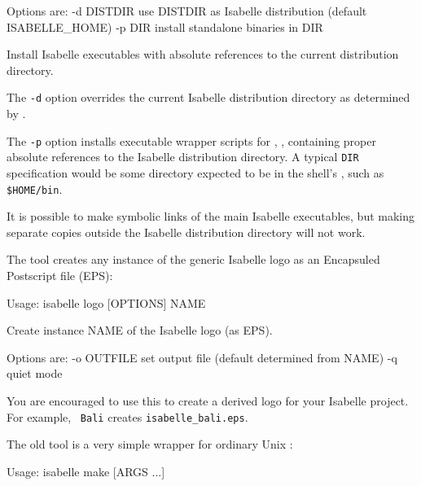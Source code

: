 \begin{isabellebody}
\begin{isamarkuptext}
\begin{ttbox}
  Options are:
    -d DISTDIR   use DISTDIR as Isabelle distribution
                 (default ISABELLE_HOME)
    -p DIR       install standalone binaries in DIR

  Install Isabelle executables with absolute references to the current
  distribution directory.
\end{ttbox}

  The \verb|-d| option overrides the current Isabelle
  distribution directory as determined by \hyperlink{setting.ISABELLE-HOME}{\mbox{}}.

  The \verb|-p| option installs executable wrapper scripts for
  \hyperlink{executable.isabelle-process}{\mbox{}}, \hyperlink{executable.isabelle}{\mbox{}}, containing
  proper absolute references to the Isabelle distribution directory.
  A typical \verb|DIR| specification would be some directory
  expected to be in the shell's \hyperlink{setting.PATH}{\mbox{}}, such as \verb|$HOME/bin|.

  It is possible to make symbolic links of the main Isabelle
  executables, but making separate copies outside the Isabelle
  distribution directory will not work.%
\end{isamarkuptext}%
\isamarkuptrue%
%
\isamarkuptrue%
%
\begin{isamarkuptext}%
The \hypertarget{tool.logo}{\hyperlink{tool.logo}{\mbox{}}} tool creates any instance of the generic
  Isabelle logo as an Encapsuled Postscript file (EPS):
\begin{ttbox}
Usage: isabelle logo [OPTIONS] NAME

  Create instance NAME of the Isabelle logo (as EPS).

  Options are:
    -o OUTFILE   set output file (default determined from NAME)
    -q           quiet mode
\end{ttbox}
  You are encouraged to use this to create a derived logo for your
  Isabelle project.  For example, \hyperlink{tool.logo}{\mbox{}}~\verb|Bali|
  creates \verb|isabelle_bali.eps|.%
\end{isamarkuptext}%
\isamarkuptrue%
%
\isamarkuptrue%
%
\begin{isamarkuptext}%
The old \hypertarget{tool.make}{\hyperlink{tool.make}{\mbox{}}} tool is a very simple wrapper for
  ordinary Unix \hyperlink{executable.make}{\mbox{}}:
\begin{ttbox}
Usage: isabelle make [ARGS ...]


\end{ttbox}
\end{isamarkuptext}
\end{isabellebody}

